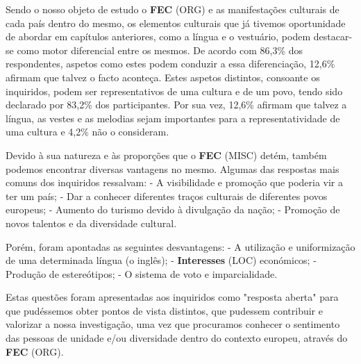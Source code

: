 \documentclass[12pt,a4paper]{article}
\begin{document}
Sendo o nosso objeto de estudo o \textbf{FEC} (ORG) e as manifestações culturais de cada país dentro  do  mesmo,  os  elementos  culturais  que  já  tivemos  oportunidade  de  abordar  em capítulos  anteriores,  como  a  língua  e  o  vestuário,  podem  destacar-se  como  motor diferencial entre os mesmos. De acordo com 86,3\% dos respondentes, aspetos como estes podem conduzir a essa diferenciação, 12,6\% afirmam que talvez o facto aconteça. Estes aspetos distintos, consoante os inquiridos, podem ser representativos de uma cultura e de um povo, tendo sido declarado por 83,2\% dos participantes. Por sua vez, 12,6\% afirmam que talvez a língua, as vestes e as melodias sejam importantes para a representatividade de uma cultura e 4,2\% não o consideram.

Devido  à  sua  natureza  e  às  proporções  que  o  \textbf{FEC} (MISC)  detém,  também  podemos encontrar  diversas  vantagens  no  mesmo.  Algumas  das  respostas  mais  comuns  dos inquiridos ressalvam: - A visibilidade e promoção que poderia vir a ter um país; - Dar a conhecer diferentes traços culturais de diferentes povos europeus; - Aumento do turismo devido à divulgação da nação; - Promoção de novos talentos e da diversidade cultural.

Porém, foram apontadas as seguintes desvantagens: - A utilização e uniformização de uma determinada língua (o inglês); - \textbf{Interesses} (LOC) económicos; - Produção de estereótipos; - O sistema de voto e imparcialidade.

Estas questões foram apresentadas aos inquiridos como "resposta aberta" para que pudéssemos obter pontos de vista distintos, que pudessem contribuir e valorizar a nossa investigação,  uma  vez  que  procuramos  conhecer  o  sentimento  das  pessoas  de  unidade e/ou diversidade dentro do contexto europeu, através do \textbf{FEC} (ORG).
\end{document}
